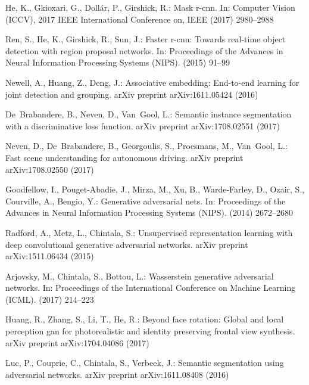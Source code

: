 \documentclass[10pt, letterpaper]{article}
\begin{document}
\begin{thebibliography}{10}
He, K., Gkioxari, G., Doll{\'a}r, P., Girshick, R.:
\newblock Mask r-cnn.
\newblock In: Computer Vision (ICCV), 2017 IEEE International Conference on,
  IEEE (2017)  2980--2988

Ren, S., He, K., Girshick, R., Sun, J.:
\newblock Faster r-cnn: Towards real-time object detection with region proposal
  networks.
\newblock In: Proceedings of the Advances in Neural Information Processing
  Systems (NIPS). (2015)  91--99

Newell, A., Huang, Z., Deng, J.:
\newblock Associative embedding: End-to-end learning for joint detection and
  grouping.
\newblock arXiv preprint arXiv:1611.05424 (2016)

De~Brabandere, B., Neven, D., Van~Gool, L.:
\newblock Semantic instance segmentation with a discriminative loss function.
\newblock arXiv preprint arXiv:1708.02551 (2017)

Neven, D., De~Brabandere, B., Georgoulis, S., Proesmans, M., Van~Gool, L.:
\newblock Fast scene understanding for autonomous driving.
\newblock arXiv preprint arXiv:1708.02550 (2017)

Goodfellow, I., Pouget-Abadie, J., Mirza, M., Xu, B., Warde-Farley, D., Ozair,
  S., Courville, A., Bengio, Y.:
\newblock Generative adversarial nets.
\newblock In: Proceedings of the Advances in Neural Information Processing
  Systems (NIPS). (2014)  2672--2680

Radford, A., Metz, L., Chintala, S.:
\newblock Unsupervised representation learning with deep convolutional
  generative adversarial networks.
\newblock arXiv preprint arXiv:1511.06434 (2015)

Arjovsky, M., Chintala, S., Bottou, L.:
\newblock Wasserstein generative adversarial networks.
\newblock In: Proceedings of the International Conference on Machine Learning
  (ICML). (2017)  214--223

Huang, R., Zhang, S., Li, T., He, R.:
\newblock Beyond face rotation: Global and local perception gan for
  photorealistic and identity preserving frontal view synthesis.
\newblock arXiv preprint arXiv:1704.04086 (2017)

Luc, P., Couprie, C., Chintala, S., Verbeek, J.:
\newblock Semantic segmentation using adversarial networks.
\newblock arXiv preprint arXiv:1611.08408 (2016)


\end{thebibliography}
\end{document}
